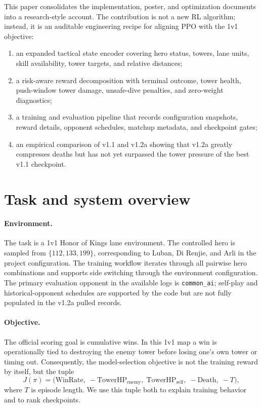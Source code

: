 \documentclass{article}
\newcommand{\winrate}{\mathrm{WinRate}}
\newcommand{\towerhp}{\mathrm{TowerHP}}
\newcommand{\death}{\mathrm{Death}}
\begin{document}
This paper consolidates the implementation, poster, and optimization documents into a research-style account. The contribution is not a new RL algorithm; instead, it is an auditable engineering recipe for aligning PPO with the 1v1 objective:
\begin{enumerate}
  \item an expanded tactical state encoder covering hero status, towers, lane units, skill availability, tower targets, and relative distances;
  \item a risk-aware reward decomposition with terminal outcome, tower health, push-window tower damage, unsafe-dive penalties, and zero-weight diagnostics;
  \item a training and evaluation pipeline that records configuration snapshots, reward details, opponent schedules, matchup metadata, and checkpoint gates;
  \item an empirical comparison of v1.1 and v1.2a showing that v1.2a greatly compresses deaths but has not yet surpassed the tower pressure of the best v1.1 checkpoint.
\end{enumerate}

\section{Task and system overview}

\paragraph{Environment.}
The task is a 1v1 Honor of Kings lane environment. The controlled hero is sampled from $\{112,133,199\}$, corresponding to Luban, Di Renjie, and Arli in the project configuration. The training workflow iterates through all pairwise hero combinations and supports side switching through the environment configuration. The primary evaluation opponent in the available logs is \texttt{common\_ai}; self-play and historical-opponent schedules are supported by the code but are not fully populated in the v1.2a pulled records.

\paragraph{Objective.}
The official scoring goal is cumulative wins. In this 1v1 map a win is operationally tied to destroying the enemy tower before losing one's own tower or timing out. Consequently, the model-selection objective is not the training reward by itself, but the tuple
\[
  J(\pi)=
  \bigl(\winrate,\; -\towerhp_{\mathrm{enemy}},\; \towerhp_{\mathrm{self}},\; -\death,\; -T\bigr),
\]
where $T$ is episode length. We use this tuple both to explain training behavior and to rank checkpoints.
\end{document}
